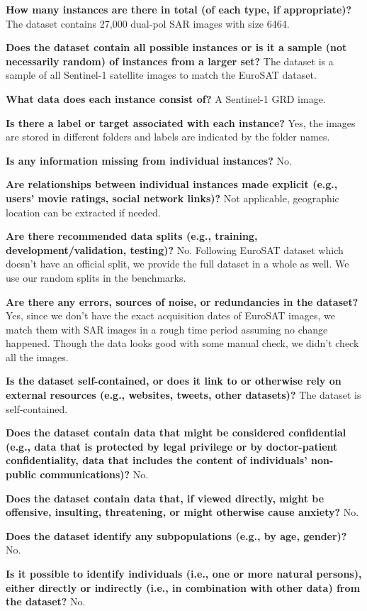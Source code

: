 \documentclass[lettersize,journal]{IEEEtran}
\begin{document}
\textbf{How many instances are there in total (of each type, if appropriate)?} The dataset contains 27,000 dual-pol SAR images with size 6464.

\textbf{Does the dataset contain all possible instances or is it a sample (not necessarily random) of instances from a larger set?} The dataset is a sample of all Sentinel-1 satellite images to match the EuroSAT dataset.

\textbf{What data does each instance consist of?} A Sentinel-1 GRD image.

\textbf{Is there a label or target associated with each instance?} Yes, the images are stored in different folders and labels are indicated by the folder names.

\textbf{Is any information missing from individual instances?} No.

\textbf{Are relationships between individual instances made explicit (e.g., users’ movie ratings, social network links)?} Not applicable, geographic location can be extracted if needed.

\textbf{Are there recommended data splits (e.g., training, development/validation, testing)?} No. Following EuroSAT dataset which doesn't have an official split, we provide the full dataset in a whole as well. We use our random splits in the benchmarks.

\textbf{Are there any errors, sources of noise, or redundancies in the dataset?} Yes, since we don't have the exact acquisition dates of EuroSAT images, we match them with SAR images in a rough time period assuming no change happened. Though the data looks good with some manual check, we didn't check all the images.

\textbf{Is the dataset self-contained, or does it link to or otherwise rely on external resources (e.g.,
websites, tweets, other datasets)?} The dataset is self-contained.

\textbf{Does the dataset contain data that might be considered confidential (e.g., data that is protected by legal privilege or by doctor-patient confidentiality, data that includes the content of individuals’ non-public communications)?} No.

\textbf{Does the dataset contain data that, if viewed directly, might be offensive, insulting, threatening, or might otherwise cause anxiety?} No.

\textbf{Does the dataset identify any subpopulations (e.g., by age, gender)?} No.

\textbf{Is it possible to identify individuals (i.e., one or more natural persons), either directly or indirectly (i.e., in combination with other data) from the dataset?} No.
\end{document}
